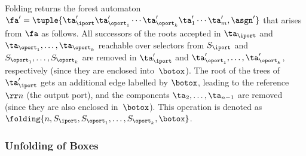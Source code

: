 Folding returns the forest automaton $\fa' = \tuple{\ta'_{\iport}
\ta'_{\oport_1} \cdots \ta'_{\oport_k} \ta'_1 \cdots \ta'_m, \asgn'}$ that arises from $\fa$ as follows.
All successors of the roots accepted in $\ta_\iport$ and $\ta_{\oport_1},
\ldots, \ta_{\oport_k}$
reachable over selectors from $S_\iport$ and $S_{\oport_1}, \ldots, S_{\oport_k}$
are removed in $\ta'_\iport$ and $\ta'_{\oport_1}, \ldots, \ta'_{\oport_k}$,
respectively (since they are enclosed into~$\botox$).
The root of the trees of $\ta'_\iport$ gets an additional edge labelled by
$\botox$, leading to the reference $\rr n$ (the output port),
and the components $\ta_2, \ldots, \ta_{n-1}$ are removed (since they are also enclosed in~$\botox$).
%
This operation is denoted as $\folding{n,S_{\iport},S_{\oport_1}, \ldots, S_{\oport_k},\botox}$.

\subsubsection*{Unfolding of Boxes}\label{sec:box_unfolding}

